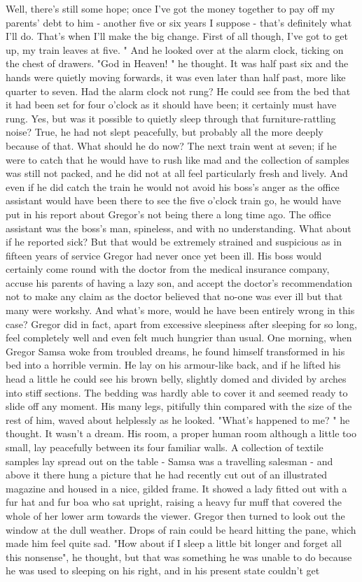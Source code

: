 \documentclass[
	listoffigures, 	%
	listoftables 	%
]{ifathesis}
\begin{document}
Well, there's still some hope; once I've got the money together to pay off my parents' debt to him - another five or six years I suppose - that's definitely what I'll do. That's when I'll make the big change. First of all though, I've got to get up, my train leaves at five. " And he looked over at the alarm clock, ticking on the chest of drawers. "God in Heaven! " he thought. It was half past six and the hands were quietly moving forwards, it was even later than half past, more like quarter to seven. Had the alarm clock not rung? He could see from the bed that it had been set for four o'clock as it should have been; it certainly must have rung. Yes, but was it possible to quietly sleep through that furniture-rattling noise? True, he had not slept peacefully, but probably all the more deeply because of that. What should he do now? The next train went at seven; if he were to catch that he would have to rush like mad and the collection of samples was still not packed, and he did not at all feel particularly fresh and lively. And even if he did catch the train he would not avoid his boss's anger as the office assistant would have been there to see the five o'clock train go, he would have put in his report about Gregor's not being there a long time ago. The office assistant was the boss's man, spineless, and with no understanding. What about if he reported sick? But that would be extremely strained and suspicious as in fifteen years of service Gregor had never once yet been ill. His boss would certainly come round with the doctor from the medical insurance company, accuse his parents of having a lazy son, and accept the doctor's recommendation not to make any claim as the doctor believed that no-one was ever ill but that many were workshy. And what's more, would he have been entirely wrong in this case? Gregor did in fact, apart from excessive sleepiness after sleeping for so long, feel completely well and even felt much hungrier than usual. One morning, when Gregor Samsa woke from troubled dreams, he found himself transformed in his bed into a horrible vermin. He lay on his armour-like back, and if he lifted his head a little he could see his brown belly, slightly domed and divided by arches into stiff sections. The bedding was hardly able to cover it and seemed ready to slide off any moment. His many legs, pitifully thin compared with the size of the rest of him, waved about helplessly as he looked. "What's happened to me? " he thought. It wasn't a dream. His room, a proper human room although a little too small, lay peacefully between its four familiar walls. A collection of textile samples lay spread out on the table - Samsa was a travelling salesman - and above it there hung a picture that he had recently cut out of an illustrated magazine and housed in a nice, gilded frame. It showed a lady fitted out with a fur hat and fur boa who sat upright, raising a heavy fur muff that covered the whole of her lower arm towards the viewer. Gregor then turned to look out the window at the dull weather. Drops of rain could be heard hitting the pane, which made him feel quite sad. "How about if I sleep a little bit longer and forget all this nonsense", he thought, but that was something he was unable to do because he was used to sleeping on his right, and in his present state couldn't get 
\end{document}
